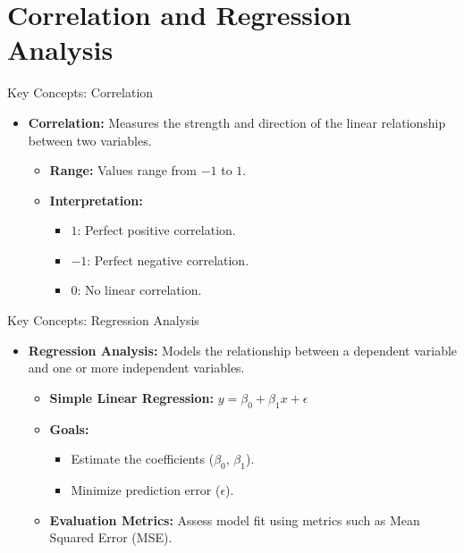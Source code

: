 \documentclass{beamer}
\begin{document}
\section{Correlation and Regression Analysis}

\begin{frame}{Key Concepts: Correlation}
\begin{itemize}
    \item \textbf{Correlation:} Measures the strength and direction of the linear relationship between two variables.
    \begin{itemize}
        \item \textbf{Range:} Values range from $-1$ to $1$.
        \item \textbf{Interpretation:}
        \begin{itemize}
            \item $1$: Perfect positive correlation.
            \item $-1$: Perfect negative correlation.
            \item $0$: No linear correlation.
        \end{itemize}
    \end{itemize}
\end{itemize}
\end{frame}

\begin{frame}{Key Concepts: Regression Analysis}
\begin{itemize}
    \item \textbf{Regression Analysis:} Models the relationship between a dependent variable and one or more independent variables.
    \begin{itemize}
        \item \textbf{Simple Linear Regression:} $y = \beta_0 + \beta_1 x + \epsilon$
        \item \textbf{Goals:}
        \begin{itemize}
            \item Estimate the coefficients ($\beta_0$, $\beta_1$).
            \item Minimize prediction error ($\epsilon$).
        \end{itemize}
        \item \textbf{Evaluation Metrics:} Assess model fit using metrics such as Mean Squared Error (MSE).
    \end{itemize}
\end{itemize}
\end{frame}
\end{document}
